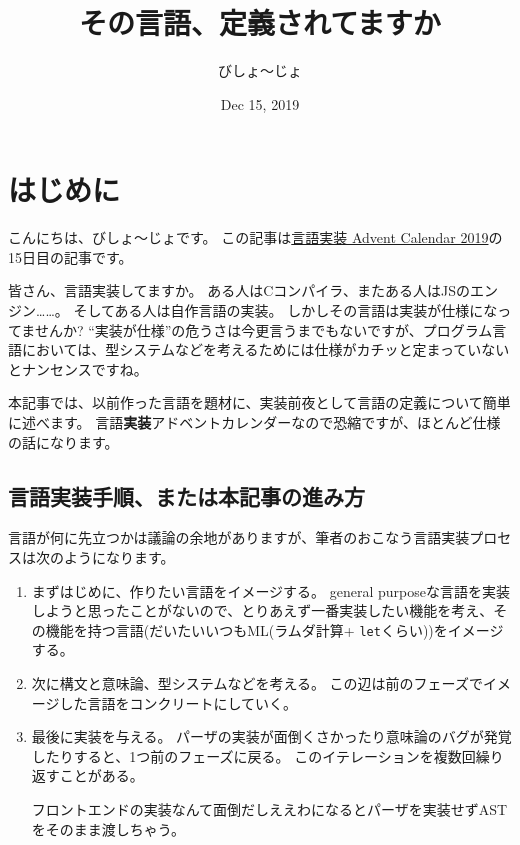 \documentclass{ltjsarticle}
\author{びしょ〜じょ}
\title{その言語、定義されてますか}
\date{Dec 15, 2019}
\begin{document}
\maketitle

\section{はじめに}
こんにちは、びしょ〜じょです。
この記事は\href{https://qiita.com/advent-calendar/2019/lang_dev}{言語実装 Advent Calendar 2019}の15日目の記事です。

皆さん、言語実装してますか。
ある人はCコンパイラ、またある人はJSのエンジン……。
そしてある人は自作言語の実装。
しかしその言語は実装が仕様になってませんか?
``実装が仕様''の危うさは今更言うまでもないですが、プログラム言語においては、型システムなどを考えるためには仕様がカチッと定まっていないとナンセンスですね。

本記事では、以前作った言語\href{https://github.com/nymphium/lambdaeff}{\lambdaeff}を題材に、実装前夜として言語の定義について簡単に述べます。
言語\textbf{実装}アドベントカレンダーなので恐縮ですが、ほとんど仕様の話になります。

\subsection{言語実装手順、または本記事の進み方}
言語が何に先立つかは議論の余地がありますが、筆者のおこなう言語実装プロセスは次のようになります。

\begin{enumerate}
  \item\label{enum:proc1}
    まずはじめに、作りたい言語をイメージする。
    general purposeな言語を実装しようと思ったことがないので、とりあえず一番実装したい機能を考え、その機能を持つ言語(だいたいいつもML(ラムダ計算+ \lstinline{let}くらい))をイメージする。

  \item\label{enum:proc2}
    次に構文と意味論、型システムなどを考える。
    この辺は前のフェーズでイメージした言語をコンクリートにしていく。

  \item\label{enum:proc3}
    最後に実装を与える。
    パーザの実装が面倒くさかったり意味論のバグが発覚したりすると、1つ前のフェーズに戻る。
    このイテレーションを複数回繰り返すことがある。

    フロントエンドの実装なんて面倒だしええわになるとパーザを実装せずASTをそのまま渡しちゃう。
\end{enumerate}
\end{document}
